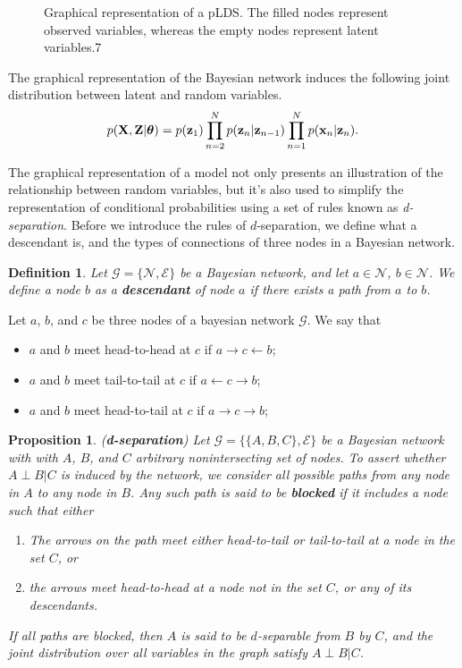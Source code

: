 \documentclass[11pt]{article}
\numberwithin{equation}{section}
\newcommand{\x}{{\bf x}}
\newcommand{\z}{{\bf z}}
\newtheorem{definition}{Definition}[section]
\newtheorem{proposition}{Proposition}[section]
\begin{document}
\begin{figure}[h!]
	\centering
	
	\caption{Graphical representation of a pLDS. The filled nodes represent observed variables, whereas the empty nodes represent latent variables.7}
	\label{fig:lds-gm}
\end{figure}

The graphical representation of the Bayesian network induces the following joint distribution between latent and random variables.
\begin{equation}
	p({\bf X}, {\bf Z} \vert\boldsymbol\theta) = p(\z_1)\prod_{n=2}^N p(\z_n\vert \z_{n-1})\prod_{n=1}^N p(\x_n\vert \z_n).
\end{equation}

The graphical representation of a model not only presents an illustration of the relationship between random variables, but it's also used to simplify the representation of conditional probabilities using a set of rules known as \textit{d-separation}. Before we introduce the rules of $d$-separation, we define what a descendant is, and the types of connections of three nodes in a Bayesian network.

\begin{definition}
	Let $\mathcal G = \{\mathscr{N}, \mathscr{E}\}$ be a Bayesian network, and let $a \in \mathscr{N}$, $b \in \mathscr{N}$. We define a node $b$ as a \textbf{descendant} of node $a$ if there exists a path from $a$ to $b$.
\end{definition}

Let $a$, $b$, and $c$ be three nodes of a bayesian network $\mathcal G$. We say that
\begin{itemize}
	\item $a$ and $b$ meet head-to-head at $c$ if $a \rightarrow c \leftarrow b $;
	\item $a$ and $b$ meet tail-to-tail at $c$ if $a \leftarrow c \rightarrow b $;
	\item $a$ and $b$ meet head-to-tail at $c$ if $a \rightarrow c \rightarrow b $;
\end{itemize}

\begin{proposition}
	(\textbf{d-separation}) Let $\mathcal G = \{\{A, B, C\}, \mathscr{E}\}$ be a Bayesian network with with $A$, $B$, and $C$ arbitrary nonintersecting set of nodes. To assert whether $A \perp B \vert C$ is induced by the network, we consider all possible paths from any node in $A$ to any node in $B$. Any such path is said to be \textbf{blocked} if it includes a node such that either
	\begin{enumerate}
		\item The arrows on the path meet either head-to-tail or tail-to-tail at a node in the set $C$, or
		\item the arrows meet head-to-head at a node not in the set $C$, or any of its descendants.
	\end{enumerate}
	If all paths are blocked, then $A$ is said to be $d$-separable from $B$ by $C$, and the joint distribution over all variables in the graph satisfy $A \perp B \vert C$.
\end{proposition}
\end{document}
